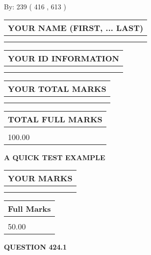 \documentclass[12pt]{article}
\begin{document}
   
\hspace{1.0in} By: 
 239 ( 416 ,  613 )
   
   
   
   
\newpage 
\setcounter{page}{ 
   424001 } 
   
   
   
   
\noindent\begin{tabular}{|l|}
\hline
YOUR NAME (FIRST, ... LAST)  \\
\hline
 \\ 
 \\ 
\hline
\end{tabular}
\hspace{0.05in} \begin{tabular}{|l|}
\hline
 YOUR   ID   INFORMATION  \\
\hline
 \\ 
 \\ 
\hline
\end{tabular}
   
   
\vspace{0.2in}\noindent\begin{tabular}{|l|}
\hline
YOUR TOTAL MARKS  \\
\hline
 \\ 
 \\ 
\hline
\end{tabular}
\hspace{0.05in} \begin{tabular}{|l|}
\hline
TOTAL FULL MARKS  \\
\hline
 \\ 
100.00 \\
\hline
\end{tabular}
   
   
 \vspace{0.2in}
{\LARGE {\textbf{ A QUICK TEST EXAMPLE}}}
   
   
  
\vspace{0.2in}
  
\noindent\begin{tabular}{|l|}
\hline
 YOUR MARKS  \\
\hline
 \\ 
 \\ 
\hline
\end{tabular}
\hspace{0.05in} \begin{tabular}{|l|}
\hline
 Full Marks  \\
\hline
 \\ 
50.00 \\
\hline
\end{tabular}
{\textbf{\Large{QUESTION
424.1 
}}}
  
\end{document}
